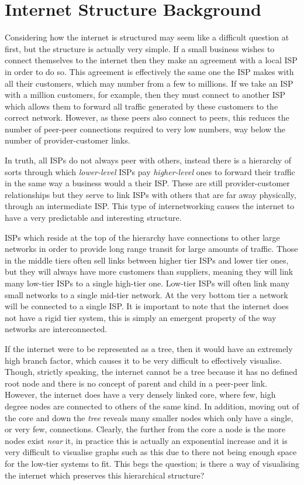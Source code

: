 \section{Internet Structure Background}

Considering how the internet is structured may seem like a difficult question at first, but the structure is actually very simple. If a small business wishes to connect themselves to the internet then they make an agreement with a local ISP in order to do so. This agreement is effectively the same one the ISP makes with all their customers, which may number from a few to millions. If we take an ISP with a million customers, for example, then they must connect to another ISP which allows them to forward all traffic generated by these customers to the correct network. However, as these peers also connect to peers, this reduces the number of peer-peer connections required to very low numbers, way below the number of provider-customer links. 

In truth, all ISPs do not always peer with others, instead there is a hierarchy of sorts through which \textit{lower-level} ISPs pay \textit{higher-level} ones to forward their traffic in the same way a business would a their ISP. These are still provider-customer relationships but they serve to link ISPs with others that are far away physically, through an intermediate ISP. This type of internetworking causes the internet to have a very predictable and interesting structure. 

ISPs which reside at the top of the hierarchy have connections to other large networks in order to provide long range transit for large amounts of traffic. Those in the middle tiers often sell links between higher tier ISPs and lower tier ones, but they will always have more customers than suppliers, meaning they will link many low-tier ISPs to a single high-tier one. Low-tier ISPs will often link many small networks to a single mid-tier network. At the very bottom tier a network will be connected to a single ISP. It is important to note that the internet does not have a rigid tier system, this is simply an emergent property of the way networks are interconnected.

If the internet were to be represented as a tree, then it would have an extremely high branch factor, which causes it to be very difficult to effectively visualise. Though, strictly speaking, the internet cannot be a tree because it has no defined root node and there is no concept of parent and child in a peer-peer link. However, the internet does have a very densely linked core, where few, high degree nodes are connected to others of the same kind. In addition, moving out of the core and down the \textit{tree} reveals many smaller nodes which only have a single, or very few, connections. Clearly, the further from the core a node is the more nodes exist \textit{near} it, in practice this is actually an exponential increase and it is very difficult to visualise graphs such as this due to there not being enough space for the low-tier systems to fit. This begs the question; is there a way of visualising the internet which preserves this hierarchical structure?

